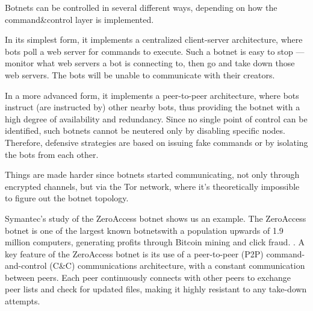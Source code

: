 Botnets can be controlled in several different ways, depending on how the command\&control layer is implemented.

In its simplest form, it implements a centralized client-server architecture, where bots poll a web server for commands to execute. Such a botnet is easy to stop — monitor what web servers a bot is connecting to, then go and take down those web servers. The bots will be unable to communicate with their creators.

In a more advanced form, it implements a peer-to-peer architecture, where bots instruct (are instructed by) other nearby bots, thus providing the botnet with a high degree of availability and redundancy. Since no single point of control can be identified, such botnets cannot be neutered only by disabling specific nodes. Therefore, defensive strategies are based on issuing fake commands or by isolating the bots from each other.

Things are made harder since botnets started communicating, not only through encrypted channels, but via the Tor network, where it’s theoretically impossible to figure out the botnet topology.

Symantec’s study of the ZeroAccess botnet shows us an example. The ZeroAccess botnet is one of the largest known botnetswith a population upwards of 1.9 million computers, generating profits through Bitcoin mining and click fraud. \cite{zeroaccess-symantec-blog,zeroaccess-symantec-definition}.
A key feature of the ZeroAccess botnet is its use of a peer-to-peer (P2P) command-and-control (C\&C) communications architecture, with a constant communication between peers. Each peer continuously connects with other peers to exchange peer lists and check for updated files, making it highly resistant to any take-down attempts.
